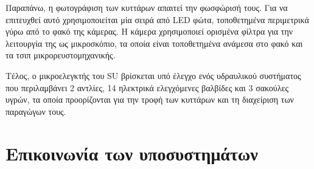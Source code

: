 \documentclass[a4paper,nobib,justified]{tufte-book}
\begin{document}
Παραπάνω, η φωτογράφιση των κυττάρων απαιτεί την φωσφώρισή τους. Για να επιτευχθεί αυτό χρησιμοποιείται μία σειρά από LED φώτα, τοποθετημένα περιμετρικά γύρω από το φακό της κάμερας. Η κάμερα χρησιμοποιεί ορισμένα φίλτρα για την λειτουργία της ως μικροσκόπιο, τα οποία είναι τοποθετημένα ανάμεσα στο φακό και τα τσιπ μικρορευστομηχανικής.

Τέλος, ο μικροελεγκτής του SU βρίσκεται υπό έλεγχο ενός υδραυλικού συστήματος που περιλαμβάνει 2 αντλίες, 14 ηλεκτρικά ελεγχόμενες βαλβίδες και 3 σακούλες υγρών, τα οποία προορίζονται για την τροφή των κυττάρων και τη διαχείριση των παραγώγων τους.

\section{Επικοινωνία των υποσυστημάτων}
\end{document}
